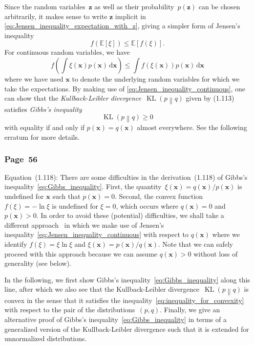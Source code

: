 \documentclass[12pt,a4paper]{article}
\newcommand{\erratum}[1]{%
\subsubsection*{#1}
\addcontentsline{toc}{subsection}{#1}}
\begin{document}
Since the random variables~$\mathbf{z}$ as well as their probability~$p(\mathbf{z})$ can be chosen
arbitrarily,
it makes sense to write $\mathbf{z}$ implicit in \eqref{eq:Jensen_inequality_expectation_with_z},
giving a simpler form of Jensen's inequality
\begin{equation}
f\left(\mathbb{E}\left[\xi\right]\right)
\leqslant \mathbb{E}\left[f\left(\xi\right)\right] .
\end{equation}
For continuous random variables, we have
\begin{equation}
f\left(\int\xi(\mathbf{x}) p(\mathbf{x}) \,\mathrm{d}\mathbf{x}\right) \leqslant
\int f\left(\xi(\mathbf{x})\right) p(\mathbf{x}) \,\mathrm{d}\mathbf{x}
\label{eq:Jensen_inequality_continuous}
\end{equation}
where we have used $\mathbf{x}$ to denote the underlying random variables
for which we take the expectations.
By making use of \eqref{eq:Jensen_inequality_continuous},
one can show that
the \emph{Kullback-Leibler divergence}~$\operatorname{KL}\left( p \middle\| q \right)$
given by (1.113) satisfies \emph{Gibbs's inequality}
\begin{equation}
\operatorname{KL}\left( p \middle\| q \right) \geqslant 0
\label{eq:Gibbs_inequality}
\end{equation}
with equality if and only if $p(\mathbf{x}) = q(\mathbf{x})$ almost everywhere.
See the following erratum for more details.

\erratum{Page~56}
Equation~(1.118):
There are some difficulties in the derivation~(1.118) of
Gibbs's inequality~\eqref{eq:Gibbs_inequality}.
First, the quantity~$\xi(\mathbf{x}) = q(\mathbf{x})/p(\mathbf{x})$ is undefined for $\mathbf{x}$
such that $p(\mathbf{x}) = 0$.
Second, the convex function~$f(\xi) = -\ln\xi$ is undefined for $\xi = 0$,
which occurs where $q(\mathbf{x}) = 0$ and $p(\mathbf{x}) > 0$.
In order to avoid these (potential) difficulties,
we shall take a different approach~\citep{MacKay:Information,KullbackLeibler:Information}
in which we make use of Jensen's inequality~\eqref{eq:Jensen_inequality_continuous}
with respect to $q(\mathbf{x})$ where
we identify $f(\xi) = \xi\ln\xi$ and
$\xi(\mathbf{x}) = p(\mathbf{x})/q(\mathbf{x})$.
Note that we can safely proceed with this approach
because we can assume $q(\mathbf{x}) > 0$ without loss of generality (see below).

In the following, we first show Gibbs's inequality~\eqref{eq:Gibbs_inequality} along this line,
after which we also see that
the Kullback-Leibler divergence~$\operatorname{KL}\left(p\middle\|q\right)$ is convex
in the sense that it satisfies the inequality~\eqref{eq:inequality_for_convexity}
with respect to the pair of the distributions~$(p, q)$.
Finally, we give an alternative proof of Gibbs's inequality~\eqref{eq:Gibbs_inequality}
in terms of a generalized version of the Kullback-Leibler divergence such that
it is extended for unnormalized distributions.
\end{document}
